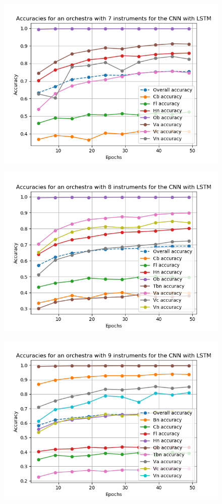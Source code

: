 \documentclass{article}
\begin{document}
\begin{figure}
\includegraphics[scale=0.6]{figs/CNN7.png}
\end{figure}
\begin{figure}
\includegraphics[scale=0.6]{figs/CNN8.png}
\end{figure}
\begin{figure}
\includegraphics[scale=0.6]{figs/CNN9.png}
\end{figure}
\end{document}
